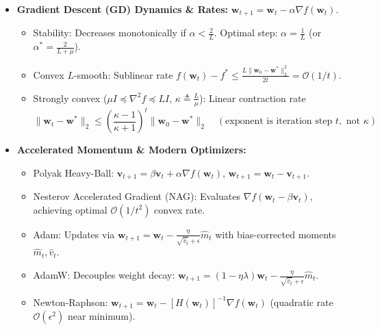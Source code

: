 \begin{tcolorbox}[breakable, colback=purplebg!30, colframe=purpleborder, title={\large \textbf{4. Multivariate Calculus \& Numerical Optimization (Weeks 2 \& 8)}}]
\begin{itemize}[leftmargin=*, noitemsep, topsep=2pt]
    \item \textbf{Gradient Descent (GD) Dynamics \& Rates:} $\mathbf{w}_{t+1} = \mathbf{w}_t - \alpha \nabla f(\mathbf{w}_t)$.
    \begin{itemize}[leftmargin=*, noitemsep]
        \item Stability: Decreases monotonically if $\alpha < \frac{2}{L}$. Optimal step: $\alpha = \frac{1}{L}$ (or $\alpha^* = \frac{2}{L+\mu}$).
        \item Convex $L$-smooth: Sublinear rate $f(\mathbf{w}_t) - f^* \le \frac{L \|\mathbf{w}_0 - \mathbf{w}^*\|_2^2}{2t} = \mathcal{O}(1/t)$.
        \item Strongly convex ($\mu I \preceq \nabla^2 f \preceq L I$, $\kappa \triangleq \frac{L}{\mu}$): Linear contraction rate
        \begin{equation*}
        \|\mathbf{w}_t - \mathbf{w}^*\|_2 \le \left(\frac{\kappa - 1}{\kappa + 1}\right)^t \|\mathbf{w}_0 - \mathbf{w}^*\|_2 \quad (\text{exponent is iteration step } t, \text{ not } \kappa)
        \end{equation*}
    \end{itemize}
    \item \textbf{Accelerated Momentum \& Modern Optimizers:}
    \begin{itemize}[leftmargin=*, noitemsep]
        \item Polyak Heavy-Ball: $\mathbf{v}_{t+1} = \beta \mathbf{v}_t + \alpha \nabla f(\mathbf{w}_t)$, $\mathbf{w}_{t+1} = \mathbf{w}_t - \mathbf{v}_{t+1}$.
        \item Nesterov Accelerated Gradient (NAG): Evaluates $\nabla f(\mathbf{w}_t - \beta \mathbf{v}_t)$, achieving optimal $\mathcal{O}(1/t^2)$ convex rate.
        \item Adam: Updates via $\mathbf{w}_{t+1} = \mathbf{w}_t - \frac{\eta}{\sqrt{\hat{v}_t} + \epsilon}\hat{m}_t$ with bias-corrected moments $\hat{m}_t, \hat{v}_t$.
        \item AdamW: Decouples weight decay: $\mathbf{w}_{t+1} = (1 - \eta \lambda)\mathbf{w}_t - \frac{\eta}{\sqrt{\hat{v}_t} + \epsilon}\hat{m}_t$.
        \item Newton-Raphson: $\mathbf{w}_{t+1} = \mathbf{w}_t - [H(\mathbf{w}_t)]^{-1}\nabla f(\mathbf{w}_t)$ (quadratic rate $\mathcal{O}(\epsilon^2)$ near minimum).
    \end{itemize}
\end{itemize}
\end{tcolorbox}

